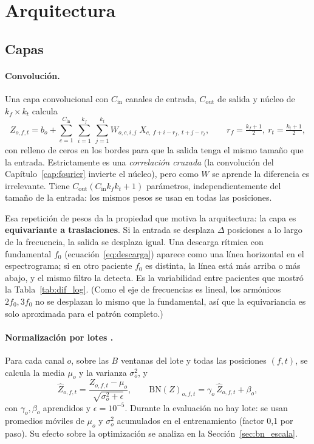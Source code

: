 \section{Arquitectura}
\label{sec:arquitectura}

\subsection{Capas}

\paragraph{Convolución.} Una capa convolucional con $C_\text{in}$ canales de entrada, $C_\text{out}$ de salida y núcleo de
$k_f \times k_t$ calcula
\begin{equation}
  Z_{o,f,t} = b_o + \sum_{c=1}^{C_\text{in}}\ \sum_{i=1}^{k_f}\ \sum_{j=1}^{k_t} W_{o,c,i,j}\; X_{c,\ f + i - r_f,\ t + j - r_t},
  \qquad r_f = \tfrac{k_f + 1}{2},\ r_t = \tfrac{k_t + 1}{2},
  \label{eq:conv}
\end{equation}
con relleno de ceros en los bordes para que la salida tenga el mismo tamaño que la entrada. Estrictamente es una
\emph{correlación cruzada} (la convolución del Capítulo~\ref{cap:fourier} invierte el núcleo), pero como $W$ se aprende la
diferencia es irrelevante. Tiene $C_\text{out}(C_\text{in}k_fk_t + 1)$ parámetros, independientemente del tamaño de la entrada:
los mismos pesos se usan en todas las posiciones.

Esa repetición de pesos da la propiedad que motiva la arquitectura: la capa es \textbf{equivariante a traslaciones}. Si la
entrada se desplaza $\Delta$ posiciones a lo largo de la frecuencia, la salida se desplaza igual. Una descarga rítmica con
fundamental $f_0$ (ecuación~\eqref{eq:descarga}) aparece como una línea horizontal en el espectrograma; si en otro paciente
$f_0$ es distinta, la línea está más arriba o más abajo, y el mismo filtro la detecta. Es la variabilidad entre pacientes que
mostró la Tabla~\ref{tab:dif_log}. (Como el eje de frecuencias es lineal, los armónicos $2f_0, 3f_0$ no se desplazan lo mismo
que la fundamental, así que la equivariancia es solo aproximada para el patrón completo.)

\paragraph{Normalización por lotes \parencite{ioffe2015}.} Para cada canal $o$, sobre las $B$ ventanas del lote y todas
las posiciones $(f, t)$, se calcula la media $\mu_o$ y la varianza $\sigma_o^2$, y
\begin{equation}
  \hat Z_{o,f,t} = \frac{Z_{o,f,t} - \mu_o}{\sqrt{\sigma_o^2 + \epsilon}}, \qquad
  \text{BN}(Z)_{o,f,t} = \gamma_o\,\hat Z_{o,f,t} + \beta_o,
  \label{eq:bn}
\end{equation}
con $\gamma_o, \beta_o$ aprendidos y $\epsilon = 10^{-5}$. Durante la evaluación no hay lote: se usan promedios móviles de
$\mu_o$ y $\sigma_o^2$ acumulados en el entrenamiento (factor 0,1 por paso). Su efecto sobre la optimización se analiza en la
Sección~\ref{sec:bn_escala}.

